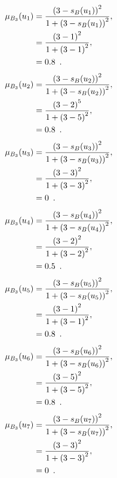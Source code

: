 \documentclass[a4paper,openany]{book}
\begin{document}
				\begin{align}
					\mu_{B_3}(u_1) &= \frac{\left(3-s_B(u_1)\right)^2}{1 + \left(3-s_B(u_1)\right)^2} ,\\
					&= \frac{\left(3-1\right)^2}{1 + \left(3-1\right)^2} \notag ,\\
					&= 0.8 \enspace. \notag
				\end{align}
				\begin{align}
					\mu_{B_3}(u_2) &= \frac{\left(3-s_B(u_2)\right)^2}{1 + \left(3-s_B(u_2)\right)^2} ,\\
					&= \frac{\left(3-2\right)^5}{1 + \left(3-5\right)^2} \notag ,\\
					&= 0.8 \enspace. \notag
				\end{align}
				\begin{align}
					\mu_{B_3}(u_3) &= \frac{\left(3-s_B(u_3)\right)^2}{1 + \left(3-s_B(u_3)\right)^2} ,\\
					&= \frac{\left(3-3\right)^2}{1 + \left(3-3\right)^2} \notag ,\\
					&= 0 \enspace. \notag
				\end{align}
				\begin{align}
					\mu_{B_3}(u_4) &= \frac{\left(3-s_B(u_4)\right)^2}{1 + \left(3-s_B(u_4)\right)^2} ,\\
					&= \frac{\left(3-2\right)^2}{1 + \left(3-2\right)^2} \notag ,\\
					&= 0.5 \enspace. \notag
				\end{align}
				\begin{align}
					\mu_{B_3}(u_5) &= \frac{\left(3-s_B(u_5)\right)^2}{1 + \left(3-s_B(u_5)\right)^2} ,\\
					&= \frac{\left(3-1\right)^2}{1 + \left(3-1\right)^2} \notag ,\\
					&= 0.8 \enspace. \notag
				\end{align}
				\begin{align}
					\mu_{B_3}(u_6) &= \frac{\left(3-s_B(u_6)\right)^2}{1 + \left(3-s_B(u_6)\right)^2} ,\\
					&= \frac{\left(3-5\right)^2}{1 + \left(3-5\right)^2} \notag ,\\
					&= 0.8 \enspace. \notag
				\end{align}
				\begin{align}
					\mu_{B_3}(u_7) &= \frac{\left(3-s_B(u_7)\right)^2}{1 + \left(3-s_B(u_7)\right)^2} ,\\
					&= \frac{\left(3-3\right)^2}{1 + \left(3-3\right)^2} \notag ,\\
					&= 0 \enspace. \notag
				\end{align}
\end{document}
